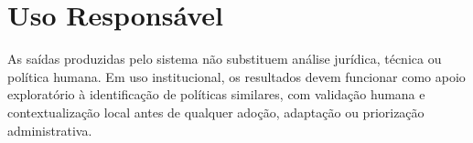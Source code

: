 \section{Uso Responsável}

As saídas produzidas pelo sistema não substituem análise jurídica, técnica ou política humana. Em uso institucional, os resultados devem funcionar como apoio exploratório à identificação de políticas similares, com validação humana e contextualização local antes de qualquer adoção, adaptação ou priorização administrativa.
